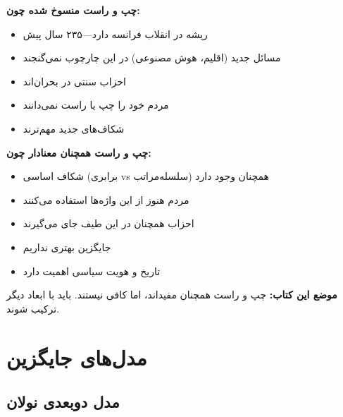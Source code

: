 \begin{tcolorbox}[
    enhanced,
    colback=LeftRed!8, %
    colframe=LeftRed, %
    boxrule=1.5pt,
    arc=5pt,
    fonttitle=\bfseries,
    title={\rl{(!) مناظره: پایان چپ و راست؟}} %
]

\textbf{چپ و راست منسوخ شده چون:}
\begin{itemize}
    \item ریشه در انقلاب فرانسه دارد—۲۳۵ سال پیش
    \item مسائل جدید (اقلیم، هوش مصنوعی) در این چارچوب نمی‌گنجند
    \item احزاب سنتی در بحران‌اند
    \item مردم خود را چپ یا راست نمی‌دانند
    \item شکاف‌های جدید مهم‌ترند
\end{itemize}



\textbf{چپ و راست همچنان معنادار چون:}
\begin{itemize}
    \item شکاف اساسی (برابری vs سلسله‌مراتب) همچنان وجود دارد
    \item مردم هنوز از این واژه‌ها استفاده می‌کنند
    \item احزاب همچنان در این طیف جای می‌گیرند
    \item جایگزین بهتری نداریم
    \item تاریخ و هویت سیاسی اهمیت دارد
\end{itemize}


\vspace{3mm}
\textbf{موضع این کتاب:} چپ و راست همچنان مفید‌اند، اما کافی نیستند. باید با ابعاد دیگر ترکیب شوند.
\end{tcolorbox}

\section{مدل‌های جایگزین}

\subsection{مدل دوبعدی نولان}

